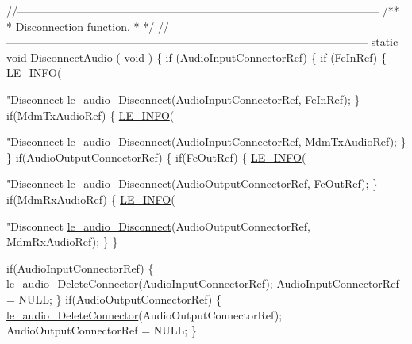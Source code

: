 \begin{DoxyCodeInclude}
\textcolor{comment}{//--------------------------------------------------------------------------------------------------}\textcolor{comment}{}
\textcolor{comment}{/**}
\textcolor{comment}{ * Disconnection function.}
\textcolor{comment}{ *}
\textcolor{comment}{ */}
\textcolor{comment}{//--------------------------------------------------------------------------------------------------}
\textcolor{keyword}{static} \textcolor{keywordtype}{void} DisconnectAudio
(
    \textcolor{keywordtype}{void}
)
\{
    \textcolor{keywordflow}{if} (AudioInputConnectorRef)
    \{
        \textcolor{keywordflow}{if} (FeInRef)
        \{
            \hyperlink{le__log_8h_a23e6d206faa64f612045d688cdde5808}{LE\_INFO}(\textcolor{stringliteral}{"Disconnect %
            \hyperlink{le__audio__interface_8h_a6b88df9301038375701e4c15a4c8aaf0}{le\_audio\_Disconnect}(AudioInputConnectorRef, FeInRef);
        \}
        \textcolor{keywordflow}{if}(MdmTxAudioRef)
        \{
            \hyperlink{le__log_8h_a23e6d206faa64f612045d688cdde5808}{LE\_INFO}(\textcolor{stringliteral}{"Disconnect %
            \hyperlink{le__audio__interface_8h_a6b88df9301038375701e4c15a4c8aaf0}{le\_audio\_Disconnect}(AudioInputConnectorRef, MdmTxAudioRef);
        \}
    \}
    \textcolor{keywordflow}{if}(AudioOutputConnectorRef)
    \{
        \textcolor{keywordflow}{if}(FeOutRef)
        \{
            \hyperlink{le__log_8h_a23e6d206faa64f612045d688cdde5808}{LE\_INFO}(\textcolor{stringliteral}{"Disconnect %
            \hyperlink{le__audio__interface_8h_a6b88df9301038375701e4c15a4c8aaf0}{le\_audio\_Disconnect}(AudioOutputConnectorRef, FeOutRef);
        \}
        \textcolor{keywordflow}{if}(MdmRxAudioRef)
        \{
            \hyperlink{le__log_8h_a23e6d206faa64f612045d688cdde5808}{LE\_INFO}(\textcolor{stringliteral}{"Disconnect %
            \hyperlink{le__audio__interface_8h_a6b88df9301038375701e4c15a4c8aaf0}{le\_audio\_Disconnect}(AudioOutputConnectorRef, MdmRxAudioRef);
        \}
    \}

    \textcolor{keywordflow}{if}(AudioInputConnectorRef)
    \{
        \hyperlink{le__audio__interface_8h_a3f40b13ff980040503927f59bb3e86a9}{le\_audio\_DeleteConnector}(AudioInputConnectorRef);
        AudioInputConnectorRef = NULL;
    \}
    \textcolor{keywordflow}{if}(AudioOutputConnectorRef)
    \{
        \hyperlink{le__audio__interface_8h_a3f40b13ff980040503927f59bb3e86a9}{le\_audio\_DeleteConnector}(AudioOutputConnectorRef);
        AudioOutputConnectorRef = NULL;
    \}

}}}}
\end{DoxyCodeInclude}
